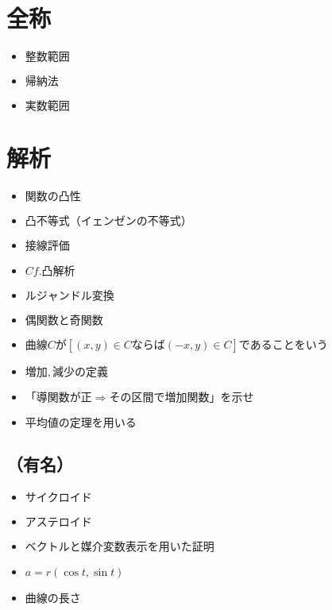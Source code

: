 \documentclass[dvipdfmx,uplatex]{jsarticle}
\begin{document}
\section{全称}
\begin{itemize}
	\item $ 整数範囲$
		\item $ 帰納法$
	\item $ 実数範囲$
\end{itemize}

\section{解析}
\begin{itemize}
	\item $ 関数の凸性$
		\item $ 凸不等式（イェンゼンの不等式）$
			\item $ 接線評価$
			\item $ Cf. 凸解析$
				\item $ ルジャンドル変換$
	\item $ 偶関数と奇関数$
		\item $ 曲線Cが [(x,y) \in C ならば (-x,y) \in C] であることをいう$
	\item $ 増加,減少の定義$
		\item $ 「導関数が正⇒その区間で増加関数」を示せ$
			\item $ 平均値の定理を用いる$
\end{itemize}
\subsection{（有名）}
\begin{itemize}
	\item $ サイクロイド$
		\item $ アステロイド$
		\item $ ベクトルと媒介変数表示を用いた証明$
			\item $ a = r(\cos t, \sin t)$
			\item $ 曲線の長さ$
\end{itemize}
\end{document}
